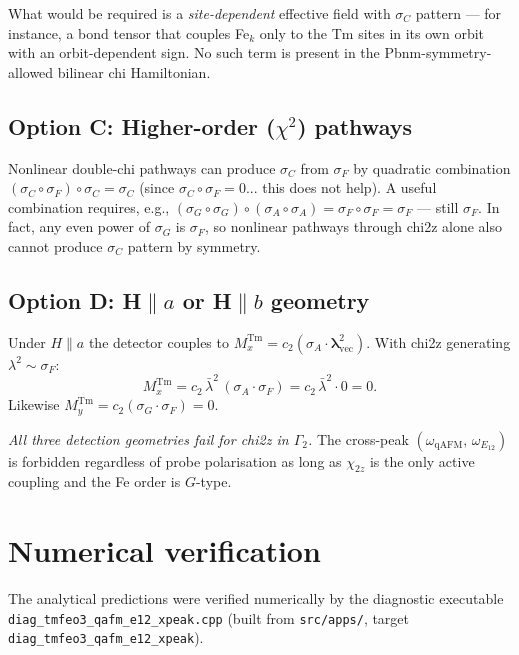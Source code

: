\documentclass[11pt,a4paper]{article}
\newcommand{\sF}{\sigma_F}
\newcommand{\sG}{\sigma_G}
\newcommand{\sA}{\sigma_A}
\newcommand{\sC}{\sigma_C}
\newcommand{\vlam}{\bm{\lambda}}
\newcommand{\lamt}{\lambda^2}
\newcommand{\Gtwo}{\Gamma_2}
\newcommand{\qAFM}{\mathrm{qAFM}}
\newcommand{\EtA}{E_{12}}
\newcommand{\crossP}{(\omega_{\qAFM},\,\omega_{\EtA})}
\begin{document}
What would be required is a \emph{site-dependent} effective field with
$\sC$ pattern — for instance, a bond tensor that couples Fe$_k$ only to the Tm
sites in its own orbit with an orbit-dependent sign.  No such term is present
in the Pbnm-symmetry-allowed bilinear chi Hamiltonian.

\subsection*{Option C: Higher-order ($\chi^2$) pathways}

Nonlinear double-chi pathways can produce $\sC$ from $\sF$ by quadratic
combination $(\sC\circ\sF)\circ\sC = \sC$ (since $\sC\circ\sF = 0$... this
does not help).  A useful combination requires, e.g.,
$(\sG\circ\sG)\circ(\sA\circ\sA) = \sF\circ\sF = \sF$ — still $\sF$.
In fact, any even power of $\sG$ is $\sF$, so nonlinear pathways through
chi2z alone also cannot produce $\sC$ pattern by symmetry.

\subsection*{Option D: H$\parallel a$ or H$\parallel b$ geometry}

Under $H\parallel a$ the detector couples to $M_x^{\mathrm{Tm}} = c_2(\sA\cdot\vlam^2_{\mathrm{vec}})$.
With chi2z generating $\lamt \sim \sF$:
\begin{equation}
  M_x^{\mathrm{Tm}} = c_2\,\bar\lambda^2\,(\sA\cdot\sF) = c_2\,\bar\lambda^2\cdot 0 = 0.
\end{equation}
Likewise $M_y^{\mathrm{Tm}} = c_2(\sG\cdot\sF) = 0$.

\emph{All three detection geometries fail for chi2z in $\Gtwo$.}  The
cross-peak $\crossP$ is forbidden regardless of probe polarisation as long as
$\chi_{2z}$ is the only active coupling and the Fe order is $G$-type.

\section{Numerical verification}
\label{sec:numeric}

The analytical predictions were verified numerically by the diagnostic
executable \texttt{diag\_tmfeo3\_qafm\_e12\_xpeak.cpp} (built from
\texttt{src/apps/}, target \texttt{diag\_tmfeo3\_qafm\_e12\_xpeak}).
\end{document}
